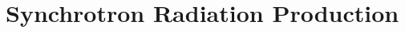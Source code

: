 \documentclass[../main.tex]{subfiles}
\begin{document}

\section{Synchrotron Radiation Production}
\label{sec:synchrotron_radiation_intro}
\end{document}
